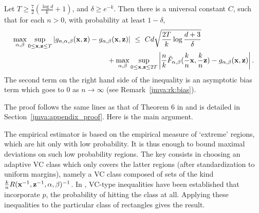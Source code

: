 \begin{proposition}
\label{jmva:prop:g}
Let $T \ge \frac{7}{2}(\frac{\log d}{k} + 1)$, and $\delta \ge e^{-k}$.  %
Then there is a universal constant $C$, such that for each $n>0$, with probability at least $1 - \delta$,%
\begin{align}
\label{jmva:ineq:g}
\max_{\alpha, \beta} \sup_{ 0 \le \mathbf x, \mathbf z \le T } &\left| g_{n, \alpha, \beta}(\mathbf x, \mathbf z) - g_{\alpha, \beta}(\mathbf x, \mathbf z) \right| ~\le~  Cd\sqrt{\frac{2T}{k}\log\frac{d+3}{\delta}} 
\\\nonumber &~~~~~~~~~~~~~~~~~~~~~~~+ \max_{\alpha, \beta}  \sup_{0 \le \mathbf x, \mathbf z \le 2T}\left|\frac{n}{k} \tilde F_{\alpha, \beta}( \frac{k}{n} \mathbf x, \frac{k}{n} \mathbf z)- g_{\alpha, \beta}(\mathbf x, \mathbf z)\right|.
\end{align}
The second term on the right hand side of the inequality is an asymptotic bias term which goes to $0$ as $n \to \infty$ (see Remark~\ref{jmva:rk:bias}).
\end{proposition}
The proof follows the same lines as that of Theorem 6 in \cite{COLT15} and is detailed in Section~\ref{jmva:appendix_proof}. Here is the main argument.

The empirical estimator is based on the empirical measure of `extreme' regions, which are hit only with  low probability. It is thus enough to bound maximal deviations on such low probability regions. The key consists in choosing an adaptive VC class which only covers the latter regions (after standardization to uniform margins), namely a VC class composed of sets of the kind $\frac{k}{n} R(\mathbf x^{-1}, \mathbf z^{-1}, \alpha, \beta)^{-1}$. In \cite{COLT15}, VC-type inequalities have been established that incorporate $p$, the probability of hitting the class at all. Applying these inequalities to the particular class of rectangles gives the result.

